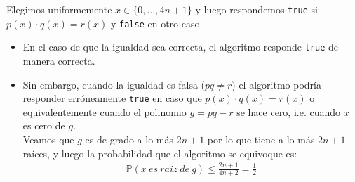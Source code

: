 \documentclass[dcc,uchile]{fcfmcourse}
\theoremstyle{plain}
\theoremstyle{definition}
\begin{document}
\begin{problems}
\problem
Elegimos uniformemente $x \in \{0, \ldots, 4n+1\}$ y luego respondemos \texttt{true} si $p(x)\cdot q(x) = r(x)$ y \texttt{false} en otro caso. 
\begin{itemize}
    \item En el caso de que la igualdad sea correcta, el algoritmo responde \texttt{true} de manera correcta.
    \item Sin embargo, cuando la igualdad es falsa ($pq\not =r$) el algoritmo podría responder erróneamente \texttt{true} en caso que $p(x)\cdot q(x) = r(x)$ o equivalentemente cuando el polinomio $g = pq - r$ se hace cero, i.e. cuando $x$ es cero de $g$.\\
    Veamos que $g$ es de grado a lo más $2n+1$ por lo que tiene a lo más $2n+1$ raíces, y luego la probabilidad que el algoritmo se equivoque es:
    \begin{align*}
        \mathbb{P}(x\ es\ raiz\ de\ g) \le \frac{2n+1}{4n+2} = \frac{1}{2}
    \end{align*}
\end{itemize}
\end{problems}
\end{document}
